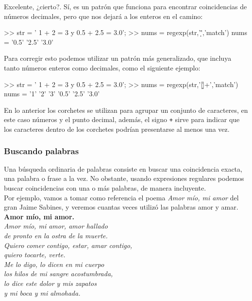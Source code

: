 Excelente, ¿cierto?. Sí, es un patrón que funciona para encontrar
coincidencias de números decimales, pero que nos dejará a los enteros en
el camino:

\begin{matlab}
>> str = ' 1 + 2 = 3 y 0.5 + 2.5 = 3.0';
>> nums = regexp(str,'\d*\.\d*','match')
nums = 
    '0.5'    '2.5'    '3.0'
\end{matlab}

Para corregir esto podemos utilizar un patrón más generalizado, que
incluya tanto números enteros como decimales, como el siguiente ejemplo:

\begin{matlab}
>> str = ' 1 + 2 = 3 y 0.5 + 2.5 = 3.0';
>> nums = regexp(str,'[\d\.]+','match')
nums = 
    '1'    '2'    '3'    '0.5'    '2.5'    '3.0'
\end{matlab}

En lo anterior los corchetes se utilizan para agrupar un conjunto de
caracteres, en este caso números y el punto decimal, además, el signo
\texttt{+} sirve para indicar que los caracteres dentro de los corchetes
podrían presentarse al menos una vez.

\subsubsection{Buscando palabras}\label{buscando-palabras}

Una búsqueda ordinaria de palabras consiste en buscar una coincidencia
exacta, una palabra o frase a la vez. No obstante, usando expresiones
regulares podemos buscar coincidencias con una o más palabras, de manera
incluyente. \\

Por ejemplo, vamos a tomar como referencia el poema \emph{Amor mío, mi
amor} del gran Jaime Sabines, y veremos cuantas veces utilizó las
palabras amor y amar. \\

\textbf{Amor mío, mi amor.} \\

\emph{Amor mío, mi amor, amor hallado}\\
\emph{de pronto en la ostra de la muerte.}\\
\emph{Quiero comer contigo, estar, amar contigo,}\\
\emph{quiero tocarte, verte.} \\

\emph{Me lo digo, lo dicen en mi cuerpo}\\
\emph{los hilos de mi sangre acostumbrada,}\\
\emph{lo dice este dolor y mis zapatos}\\
\emph{y mi boca y mi almohada.} \\ 

